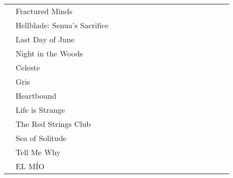 \documentclass[twoside]{tfg-urjc}
\begin{document}
\begin{landscape}
\begin{longtable}{l  l  *{15}{c} }
                      & Fractured Minds              &      &      &        &       &                      &                   &                   &                   &                   \\
                      & Hellblade: Senua's Sacrifice &      &      &        &       &                      &                   &                   &                   &                   \\
                      & Last Day of June             &      &      &        &       &                      &                   &                   &                   &                   \\
                      & Night in the Woods           &      &      &        &       &                      &                   &                   &                   &                   \\
                      & Celeste                      &      &      &        &       &                      &                   &                   &                   &                   \\
                      & Gris                         &      &      &        &       &                      &                   &                   &                   &                   \\
                      & Heartbound                   &      &      &        &       &                      &                   &                   &                   &                   \\
                      & Life is Strange              &      &      &        &       &                      &                   &                   &                   &                   \\
                      & The Red Strings Club         &      &      &        &       &                      &                   &                   &                   &                   \\
                      & Sea of Solitude              &      &      &        &       &                      &                   &                   &                   &                   \\
                      & Tell Me Why                  &      &      &        &       &                      &                   &                   &                   &                   \\
                      & EL MÍO                       &      &      &        &       &                      &                   &                   &                   &                   \\
\bottomrule
                    \end{longtable}
\end{landscape}
\end{document}
